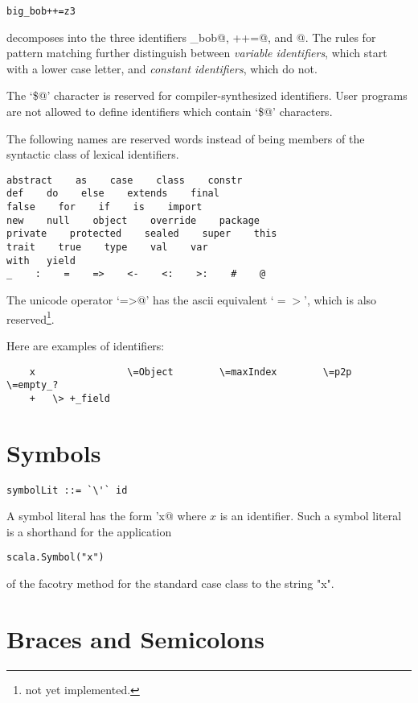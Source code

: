 \documentclass[11pt]{report}
\newcommand{\notyet}{\footnote{not yet implemented.}}
\begin{document}
\begin{verbatim}
big_bob++=z3
\end{verbatim}

decomposes into the three identifiers \verb@big_bob@, \verb@++=@, and
@.  The rules for pattern matching further distinguish between
{\em variable identifiers}, which start with a lower case letter, and
{\em constant identifiers}, which do not.


The `\verb@\$@' character is reserved for compiler-synthesized identifiers.
User programs are not allowed to define identifiers which contain `\verb@\$@'
characters.

The following names are reserved words instead of being members of the
syntactic class \verb@id@ of lexical identifiers.

\begin{verbatim}
abstract    as    case    class    constr
def    do    else    extends    final    
false    for    if    is    import
new    null    object    override    package    
private    protected    sealed    super    this    
trait    true    type    val    var    
with   yield
_    :    =    =>    <-    <:    >:    #    @
\end{verbatim}

The unicode operator `\verb@=>@' has the ascii equivalent
`$=>$', which is also reserved\notyet.

\example
Here are examples of identifiers:
\begin{verbatim}
    x                \=Object        \=maxIndex        \=p2p             \=empty_?
    +   \> +_field
\end{verbatim}

\section{Symbols}

\syntax\begin{verbatim}
symbolLit ::= `\'` id
\end{verbatim}

A symbol literal has the form \verb@'x@ where $x$ is an identifier.
Such a symbol literal is a  shorthand for the application
\begin{verbatim}
scala.Symbol("x")
\end{verbatim}
of the facotry method for the standard case class \verb@Symbol@ to the string "x".

\section{Braces and Semicolons}
\end{document}
